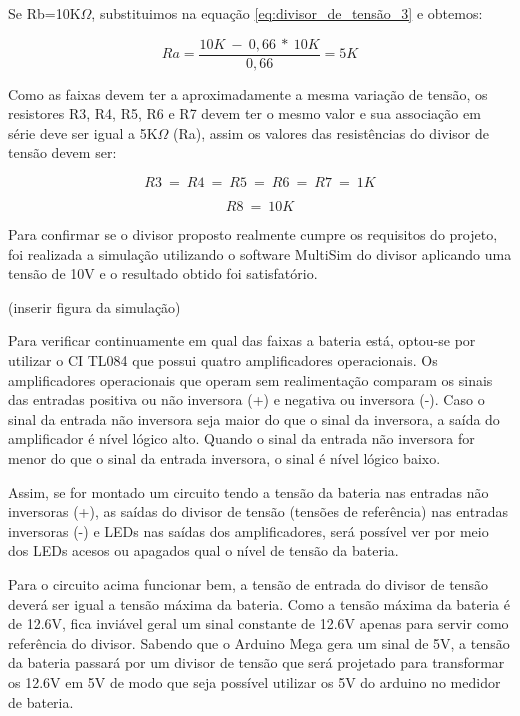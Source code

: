 		Se Rb=10K$\Omega$, substituimos na equação \ref{eq:divisor_de_tensão_3} e obtemos:

		\begin{equation}
		\label{eq:divisor_de_tensão_4}
			Ra=\frac{10K\ -\ 0,66\ *\ 10K}{0,66} = 5K
		\end{equation}

		Como as faixas devem ter a aproximadamente a mesma variação de tensão, os resistores R3, R4, R5, R6 e R7 devem ter o mesmo valor e sua associação em série deve ser igual a 5K$\Omega$ (Ra), assim os valores das resistências do divisor de tensão devem ser:

		\begin{equation}
		\label{eq:divisor_de_tensão_5}
			R3\ =\ R4\ =\ R5\ =\ R6\ =\ R7\ =\ 1K
		\end{equation}

		\begin{equation}
		\label{eq:divisor_de_tensão_6}
			R8\ =\ 10K
		\end{equation}

		Para confirmar se o divisor proposto realmente cumpre os requisitos do projeto, foi realizada a simulação utilizando o software MultiSim do divisor aplicando uma tensão de 10V e o resultado obtido foi satisfatório.

		(inserir figura da simulação)

		Para verificar continuamente em qual das faixas a bateria está, optou-se por utilizar o CI TL084 que possui quatro amplificadores operacionais. Os amplificadores operacionais que operam sem realimentação comparam os sinais das entradas positiva ou não inversora (+) e negativa ou inversora (-). Caso o sinal da entrada não inversora seja maior do que o sinal da inversora, a saída do amplificador é nível lógico alto. Quando o sinal da entrada não inversora for menor do que o sinal da entrada inversora, o sinal é nível lógico baixo.

		Assim, se for montado um circuito tendo a tensão da bateria nas entradas não inversoras (+), as saídas do divisor de tensão (tensões de referência) nas entradas inversoras (-) e LEDs nas saídas dos amplificadores, será possível ver por meio dos LEDs acesos ou apagados qual o nível de tensão da bateria.

		Para o circuito acima funcionar bem, a tensão de entrada do divisor de tensão deverá ser igual a tensão máxima da bateria. Como a tensão máxima da bateria é de 12.6V, fica inviável geral um sinal constante de 12.6V apenas para servir como referência do divisor. Sabendo que o Arduino Mega gera um sinal de 5V, a tensão da bateria passará por um divisor de tensão  que será projetado para transformar os 12.6V em 5V de modo que seja possível utilizar os 5V do arduino no medidor de bateria.

